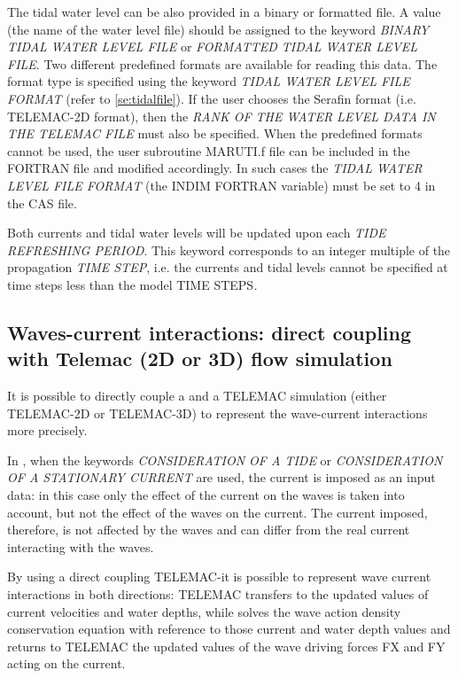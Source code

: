  The tidal water level can be also provided in a binary or formatted file. A value (the name of the water level file) should be assigned to the keyword \textit{BINARY TIDAL WATER LEVEL FILE} or\textit{ FORMATTED TIDAL WATER LEVEL FILE}. Two different predefined formats are available for reading this data. The format type is specified using the keyword \textit{TIDAL WATER LEVEL FILE FORMAT} (refer to \ref{se:tidalfile}). If the user chooses the Serafin format (i.e. TELEMAC-2D format), then the \textit{RANK OF THE WATER LEVEL DATA IN THE TELEMAC FILE} must also be specified. When the predefined formats cannot be used, the user subroutine MARUTI.f file can be included in the FORTRAN file and modified accordingly. In such cases the \textit{TIDAL WATER LEVEL FILE FORMAT} (the INDIM FORTRAN variable) must be set to 4 in the CAS file.

 Both currents and tidal water levels will be updated upon each \textit{TIDE REFRESHING PERIOD}. This keyword corresponds to an integer multiple of the propagation \textit{TIME STEP}, i.e. the currents and tidal levels cannot be specified at time steps less than the model TIME STEPS\textit{.}


\subsection{ Waves-current interactions: direct coupling with Telemac (2D or 3D) flow simulation}

 It is possible to directly couple a \tomawac and a TELEMAC simulation (either TELEMAC-2D or TELEMAC-3D) to represent the wave-current interactions more precisely.

 In \tomawac, when the keywords \textit{CONSIDERATION OF A TIDE} or \textit{CONSIDERATION OF A STATIONARY CURRENT} are used, the current is imposed as an input data: in this case only the effect of the current on the waves is taken into account, but not the effect of the waves on the current. The current imposed, therefore, is not affected by the waves and can differ from the real current interacting with the waves.

 By using a direct coupling TELEMAC-\tomawac it is possible to represent wave current interactions in both directions: TELEMAC transfers to \tomawac the updated values of current velocities and water depths, while \tomawac solves the wave action density conservation equation with reference to those current and water depth values and returns to TELEMAC the updated values of the wave driving forces FX and FY acting on the current.


